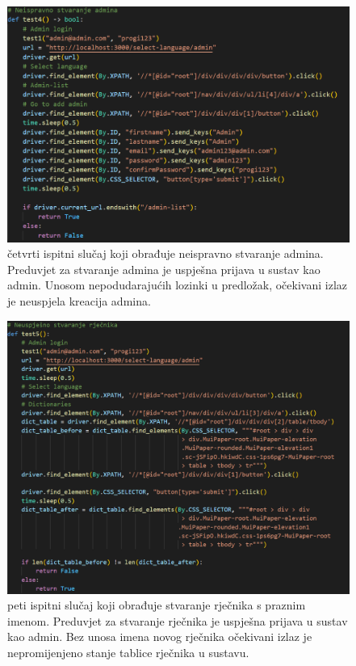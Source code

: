 \begin{figure}[htp]
    \caption{četvrti ispitni slučaj koji obrađuje neispravno stvaranje admina. Preduvjet za stvaranje admina je uspješna prijava u sustav kao admin. Unosom nepodudarajućih lozinki u predložak, očekivani izlaz je neuspjela kreacija admina.}
    \includegraphics[scale=0.5]{dijagrami/test4.png}
    \centering
    
\end{figure}
\break

\begin{figure}[htp]
    \caption{peti ispitni slučaj koji obrađuje stvaranje rječnika s praznim imenom. Preduvjet za stvaranje rječnika je uspješna prijava u sustav kao admin. Bez unosa imena novog rječnika očekivani izlaz je nepromijenjeno stanje tablice rječnika u sustavu.}
    \includegraphics[scale=0.5]{dijagrami/test5.png}
    \centering
    
\end{figure}
\break

